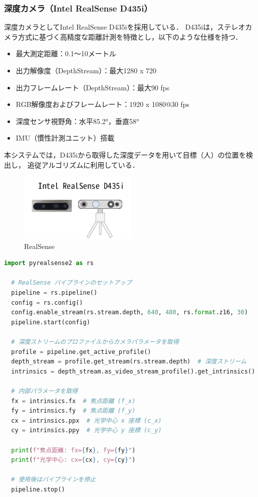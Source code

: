 \subsubsection{深度カメラ（Intel RealSense D435i）}
深度カメラとしてIntel RealSense D435iを採用している．
D435iは，ステレオカメラ方式に基づく高精度な距離計測を特徴とし，以下のような仕様を持つ\cite{realsense}．
\begin{itemize}
  \item 最大測定距離：0.1～10メートル
  \item 出力解像度（DepthStream）：最大1280 x 720
  \item 出力フレームレート（DepthStream）：最大90 fps
  \item RGB解像度およびフレームレート：1920 x 1080@30 fps
  \item 深度センサ視野角：水平85.2°，垂直58°
  \item IMU（慣性計測ユニット）搭載
\end{itemize}
本システムでは，D435iから取得した深度データを用いて目標（人）の位置を検出し，
追従アルゴリズムに利用している．

\begin{figure}[H]
  \centering
  \includegraphics[width=0.5\textwidth]{figure/RealSense.pdf}
  \caption{RealSense}
  \label{fig:RealSense}
\end{figure}

\begin{lstlisting}[language=Python, caption=RealSense内部パラメータの取得]
  import pyrealsense2 as rs
  
  # RealSense パイプラインのセットアップ
  pipeline = rs.pipeline()
  config = rs.config()
  config.enable_stream(rs.stream.depth, 640, 480, rs.format.z16, 30)
  pipeline.start(config)
  
  # 深度ストリームのプロファイルからカメラパラメータを取得
  profile = pipeline.get_active_profile()
  depth_stream = profile.get_stream(rs.stream.depth)  # 深度ストリーム
  intrinsics = depth_stream.as_video_stream_profile().get_intrinsics()
  
  # 内部パラメータを取得
  fx = intrinsics.fx  # 焦点距離 (f_x)
  fy = intrinsics.fy  # 焦点距離 (f_y)
  cx = intrinsics.ppx  # 光学中心 x 座標 (c_x)
  cy = intrinsics.ppy  # 光学中心 y 座標 (c_y)
  
  print(f"焦点距離: fx={fx}, fy={fy}")
  print(f"光学中心: cx={cx}, cy={cy}")
  
  # 使用後はパイプラインを停止
  pipeline.stop()
  \end{lstlisting}

